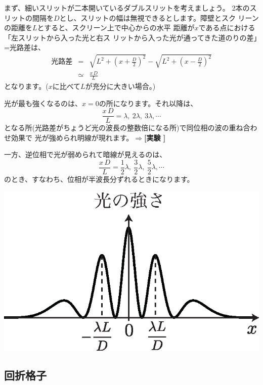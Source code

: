 まず、細いスリットが二本開いているダブルスリットを考えましょう。
2本のスリットの間隔を$D$とし、スリットの幅は無視できるとします。障壁とスク
リーンの距離を$L$とすると、スクリーン上で中心からの水平
距離が$x$である点における「左スリットから入った光と右ス
リットから入った光が通ってきた道のりの差」=光路差は、
\begin{eqnarray}
光路差&=&\sqrt{L^2+\left(x+\frac{D}{2}\right)^2}
-\sqrt{L^2+\left(x-\frac{D}{2}\right)^2}\nonumber\\
&\simeq& \frac{x\,D}{L}\nonumber
\end{eqnarray}
となります。($x$に比べて$L$が充分に大きい場合。)

光が最も強くなるのは、$x=0$の所になります。それ以降は、
\[
\frac{x\,D}{L}=\lambda,~2\lambda,~3\lambda,\cdots
\]
となる所(光路差がちょうど光の波長の整数倍になる所)で同位相の波の重ね合わせ効果で
光が強められ明線が現れます。$\Rightarrow${\bf [実験 ]}

一方、逆位相で光が弱められて暗線が見えるのは、
\[
\frac{x\,D}{L}=\frac{1}{2}\lambda,~\frac{3}{2}\lambda,~\frac{5}{2}\lambda,\cdots
\]
のとき、すなわち、位相が半波長分ずれるときになります。 

\begin{center}
\includegraphics[scale=0.7]{03_Interference/two-slits-int.eps}
\end{center}


\subsection{回折格子}

